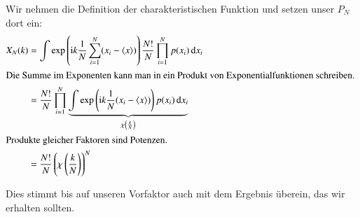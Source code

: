 Wir nehmen die Definition der charakteristischen Funktion und setzen unser
$P_N$ dort ein:
\begin{align*}
    X_N(k)
    &= \int \exp\del{\mathrm i k \frac 1N \sum_{i=1}^N (x_i - \langle x \rangle)}
    \frac{N!}N \prod_{i=1}^N p(x_i) \dif x_i \\
    \intertext{%
        Die Summe im Exponenten kann man in ein Produkt von
        Exponentialfunktionen schreiben.
    }
    &= \frac{N!}N \prod_{i=1}^N \underbrace{\int 
        \exp\del{\mathrm i k \frac 1N (x_i - \langle x \rangle)}
    p(x_i) \dif x_i}_{\chi\del{\frac kN}} \\
    \intertext{%
        Produkte gleicher Faktoren sind Potenzen.
    }
    &= \frac{N!}N \del{\chi\del{\frac kN}}^N
\end{align*}

Dies stimmt bis auf unseren Vorfaktor auch mit dem Ergebnis überein, das wir
erhalten sollten.



